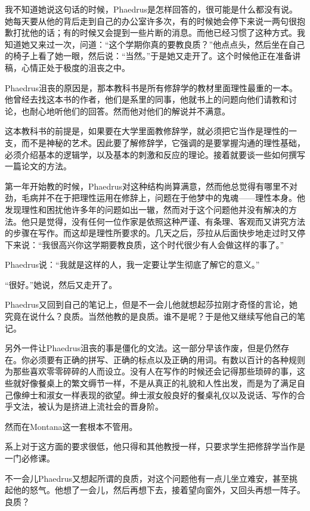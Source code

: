 \documentclass[UTF8]{article}
\begin{document}
\par 我不知道她说这句话的时候，Phaedrus是怎样回答的，很可能是什么都没有说。她每天要从他的背后走到自己的办公室许多次，有的时候她会停下来说一两句很抱歉打扰他的话；有的时候又会提到一些片断的消息。而他已经习惯了这种方式。我知道她又来过一次，问道：“这个学期你真的要教良质？”他点点头，然后坐在自己的椅子上看了她一眼，然后说：“当然。”于是她又走开了。这个时候他正在准备讲稿，心情正处于极度的沮丧之中。
\par Phaedrus沮丧的原因是，那本教科书是所有修辞学的教材里面理性最重的一本。他曾经去找这本书的作者，他们是系里的同事，他就书上的问题向他们请教和讨论，也耐心地听他们的回答。然而他对他们的解说并不满意。
\par 这本教科书的前提是，如果要在大学里面教修辞学，就必须把它当作是理性的一支，而不是神秘的艺术。因此要了解修辞学，它强调的是要掌握沟通的理性基础，必须介绍基本的逻辑学，以及基本的刺激和反应的理论。接着就要谈一些如何撰写一篇论文的方法。
\par 第一年开始教的时候，Phaedrus对这种结构尚算满意，然而他总觉得有哪里不对劲，毛病并不在于把理性运用在修辞上，问题在于他梦中的鬼魂——理性本身。他发现理性和困扰他许多年的问题如出一辙，然而对于这个问题他并没有解决的方法。他只是觉得，没有任何一位作家是依照这种严谨、有条理、客观而又讲究方法的步骤在写作。而这却是理性所要求的。几天之后，莎拉从后面快步地走过时又停下来说：“我很高兴你这学期要教良质，这个时代很少有人会做这样的事了。”
\par Phaedrus说：“我就是这样的人，我一定要让学生彻底了解它的意义。”
\par “很好。”她说，然后又走开了。
\par Phaedrus又回到自己的笔记上，但是不一会儿他就想起莎拉刚才奇怪的言论，她究竟在说什么？良质。当然他教的是良质。谁不是呢？于是他又继续写他自己的笔记。
\par 另外一件让Phaedrus沮丧的事是僵化的文法。这一部分早该作废，但是仍然存在。你必须要有正确的拼写、正确的标点以及正确的用词。有数以百计的各种规则为那些喜欢零零碎碎的人而设立。没有人在写作的时候还会记得那些琐碎的事，这些就好像餐桌上的繁文缛节一样，不是从真正的礼貌和人性出发，而是为了满足自己像绅士和淑女一样表现的欲望。绅士淑女般良好的餐桌礼仪以及说话、写作的合乎文法，被认为是挤进上流社会的晋身阶。
\par 然而在Montana这一套根本不管用。
\par 系上对于这方面的要求很低，他只得和其他教授一样，只要求学生把修辞学当作是一门必修课。
\par 不一会儿Phaedrus又想起所谓的良质，对这个问题他有一点儿坐立难安，甚至挑起他的怒气。他想了一会儿，然后再想下去，接着望向窗外，又回头再想一阵子。良质？
\end{document}

